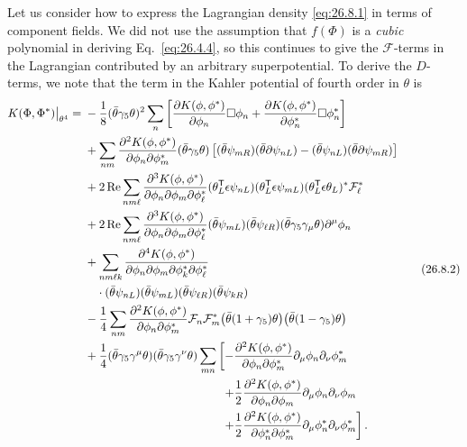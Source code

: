 Let us consider how to express the Lagrangian density \eqref{eq:26.8.1} in
terms of component fields. We did not use the assumption that \(f(\Phi)\) is
a \textit{cubic} polynomial in deriving Eq.~\eqref{eq:26.4.4}, so this
continues to give the \(\mathcal{F}\)-terms in the Lagrangian contributed by
an arbitrary superpotential. To derive the \(D\)-terms, we note that the term
in the Kahler potential of fourth order in \(\theta\) is
\begin{equation}
  \begin{aligned}
  K(\Phi,\Phi^*)\big|_{\theta^4}
  ={}&
  -\frac18(\bar\theta\gamma_5\theta)^2
  \sum_n\left[
    \frac{\partial K(\phi,\phi^*)}{\partial\phi_n}\Box\phi_n
    +\frac{\partial K(\phi,\phi^*)}{\partial\phi_n^*}\Box\phi_n^*
  \right]
  \\
  &+\sum_{nm}
  \frac{\partial^2K(\phi,\phi^*)}
       {\partial\phi_n\partial\phi_m^*}
  (\bar\theta\gamma_5\theta)
  \left[
    (\bar\theta\psi_{mR})(\bar\theta\sl{\partial}\psi_{nL})
    -(\bar\theta\psi_{nL})(\bar\theta\sl{\partial}\psi_{mR})
  \right]
  \\
  &+2\operatorname{Re}\sum_{nm\ell}
  \frac{\partial^3K(\phi,\phi^*)}
       {\partial\phi_n\partial\phi_m\partial\phi_\ell^*}
  (\theta_L^{\mathsf T}\epsilon\psi_{nL})
  (\theta_L^{\mathsf T}\epsilon\psi_{mL})
  (\theta_L^{\mathsf T}\epsilon\theta_L)^*\mathcal{F}_\ell^*
  \\
  &+2\operatorname{Re}\sum_{nm\ell}
  \frac{\partial^3K(\phi,\phi^*)}
       {\partial\phi_n\partial\phi_m\partial\phi_\ell^*}
  (\bar\theta\psi_{mL})(\bar\theta\psi_{\ell R})
  (\bar\theta\gamma_5\gamma_\mu\theta)\partial^\mu\phi_n
  \\
  &+\sum_{nm\ell k}
  \frac{\partial^4K(\phi,\phi^*)}
       {\partial\phi_n\partial\phi_m
        \partial\phi_k^*\partial\phi_\ell^*}
  \\
  &\quad{}\cdot
  (\bar\theta\psi_{nL})(\bar\theta\psi_{mL})
  (\bar\theta\psi_{\ell R})(\bar\theta\psi_{kR})
  \\
  &-\frac14\sum_{nm}
  \frac{\partial^2K(\phi,\phi^*)}
       {\partial\phi_n\partial\phi_m^*}
  \mathcal{F}_n\mathcal{F}_m^*
  \bigl(\bar\theta(1+\gamma_5)\theta\bigr)
  \bigl(\bar\theta(1-\gamma_5)\theta\bigr)
  \\
  &+\frac14
  (\bar\theta\gamma_5\gamma^\mu\theta)
  (\bar\theta\gamma_5\gamma^\nu\theta)
  \sum_{mn}\left[
    -\frac{\partial^2K(\phi,\phi^*)}
          {\partial\phi_n\partial\phi_m^*}
      \partial_\mu\phi_n\partial_\nu\phi_m^*
  \right.
  \\
  &\hspace{41mm}\left.
    +\frac12
      \frac{\partial^2K(\phi,\phi^*)}
           {\partial\phi_n\partial\phi_m}
      \partial_\mu\phi_n\partial_\nu\phi_m
  \right.
  \\
  &\hspace{41mm}\left.
    +\frac12
      \frac{\partial^2K(\phi,\phi^*)}
           {\partial\phi_n^*\partial\phi_m^*}
      \partial_\mu\phi_n^*\partial_\nu\phi_m^*
  \right] .
  \end{aligned}
  \tag{26.8.2}\label{eq:26.8.2}
\end{equation}
